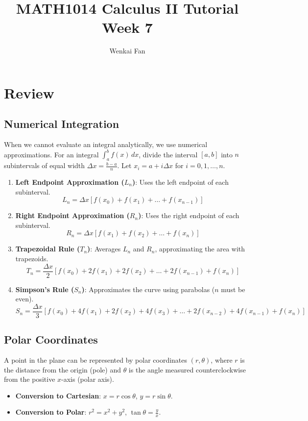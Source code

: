 \documentclass[11pt]{article}
\title{\vspace{-1.0em}MATH1014 Calculus II Tutorial\\Week 7}
\author{Wenkai Fan}
\date{}
\theoremstyle{definition}
\begin{document}
\maketitle
\thispagestyle{fancy}

\section{Review}

\subsection{Numerical Integration}
When we cannot evaluate an integral analytically, we use numerical approximations. For an integral $\int_a^b f(x)\,dx$, divide the interval $[a,b]$ into $n$ subintervals of equal width $\Delta x = \frac{b-a}{n}$. Let $x_i = a + i\Delta x$ for $i=0,1,\dots,n$.
\begin{enumerate}
    \item \textbf{Left Endpoint Approximation ($L_n$)}: Uses the left endpoint of each subinterval.
    \[
    L_n = \Delta x [f(x_0) + f(x_1) + \dots + f(x_{n-1})]
    \]
    \item \textbf{Right Endpoint Approximation ($R_n$)}: Uses the right endpoint of each subinterval.
    \[
    R_n = \Delta x [f(x_1) + f(x_2) + \dots + f(x_n)]
    \]
    \item \textbf{Trapezoidal Rule ($T_n$)}: Averages $L_n$ and $R_n$, approximating the area with trapezoids.
    \[
    T_n = \frac{\Delta x}{2} [f(x_0) + 2f(x_1) + 2f(x_2) + \dots + 2f(x_{n-1}) + f(x_n)]
    \]
    \item \textbf{Simpson's Rule ($S_n$)}: Approximates the curve using parabolas ($n$ must be even).
    \[
    S_n = \frac{\Delta x}{3} [f(x_0) + 4f(x_1) + 2f(x_2) + 4f(x_3) + \dots + 2f(x_{n-2}) + 4f(x_{n-1}) + f(x_n)]
    \]
\end{enumerate}

\subsection{Polar Coordinates}
A point in the plane can be represented by polar coordinates $(r, \theta)$, where $r$ is the distance from the origin (pole) and $\theta$ is the angle measured counterclockwise from the positive $x$-axis (polar axis).
\begin{itemize}
    \item \textbf{Conversion to Cartesian}: $x = r\cos\theta$, $y = r\sin\theta$.
    \item \textbf{Conversion to Polar}: $r^2 = x^2 + y^2$, $\tan\theta = \frac{y}{x}$.
\end{itemize}
\end{document}
